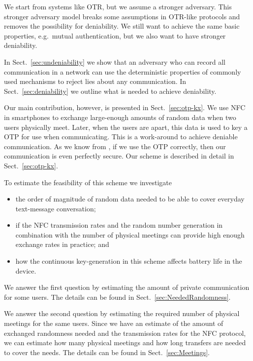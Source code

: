 We start from systems like \ac{OTR}, but we assume a stronger adversary.
This stronger adversary model breaks some assumptions in \ac{OTR}-like 
protocols and removes the possibility for deniability.
We still want to achieve the same basic properties, e.g.~mutual authentication, 
but we also want to have stronger deniability.

In Sect.~\ref{sec:undeniability} we show that an adversary who can record all 
communication in a network can use the deterministic properties of commonly 
used mechanisms to reject lies about any communication.
In Sect.~\ref{sec:deniability} we outline what is needed to achieve 
deniability.

Our main contribution, however, is presented in Sect.~\ref{sec:otp-kx}.
We use \ac{NFC} in smartphones to exchange large-enough amounts of random data 
when two users physically meet.
Later, when the users are apart, this data is used to key a \ac{OTP} for use 
when communicating.
This is a work-around to achieve deniable communication.
As we know from \citet{ShannonSecrecy}, if we use the \ac{OTP} correctly, then 
our communication is even perfectly secure.
Our scheme is described in detail in Sect.~\ref{sec:otp-kx}.

To estimate the feasibility of this scheme we investigate
\begin{itemize}
  \item the order of magnitude of random data needed to be able to cover 
    everyday text-message conversation;

  \item if the \ac{NFC} transmission rates and the random number generation in 
    combination with the number of physical meetings can provide high enough 
    exchange rates in practice; and

  \item how the continuous key-generation in this scheme affects battery life 
    in the device.
\end{itemize}

We answer the first question by estimating the amount of private communication 
for some users.
The details can be found in Sect.~\ref{sec:NeededRandomness}.

We answer the second question by estimating the required number of physical 
meetings for the same users.
Since we have an estimate of the amount of exchanged randomness needed and the 
transmission rates for the \ac{NFC} protocol, we can estimate how many physical 
meetings and how long transfers are needed to cover the needs.
The details can be found in Sect.~\ref{sec:Meetings}.

